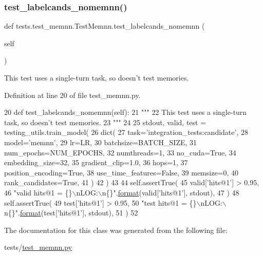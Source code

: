\subsubsection{\texorpdfstring{test\+\_\+labelcands\+\_\+nomemnn()}{test\_labelcands\_nomemnn()}}
{\footnotesize\ttfamily def tests.\+test\+\_\+memnn.\+Test\+Memnn.\+test\+\_\+labelcands\+\_\+nomemnn (\begin{DoxyParamCaption}\item[{}]{self }\end{DoxyParamCaption})}

\begin{DoxyVerb}This test uses a single-turn task, so doesn't test memories.
\end{DoxyVerb}
 

Definition at line 20 of file test\+\_\+memnn.\+py.


\begin{DoxyCode}
20     \textcolor{keyword}{def }test\_labelcands\_nomemnn(self):
21         \textcolor{stringliteral}{"""}
22 \textcolor{stringliteral}{        This test uses a single-turn task, so doesn't test memories.}
23 \textcolor{stringliteral}{        """}
24 
25         stdout, valid, test = testing\_utils.train\_model(
26             dict(
27                 task=\textcolor{stringliteral}{'integration\_tests:candidate'},
28                 model=\textcolor{stringliteral}{'memnn'},
29                 lr=LR,
30                 batchsize=BATCH\_SIZE,
31                 num\_epochs=NUM\_EPOCHS,
32                 numthreads=1,
33                 no\_cuda=\textcolor{keyword}{True},
34                 embedding\_size=32,
35                 gradient\_clip=1.0,
36                 hops=1,
37                 position\_encoding=\textcolor{keyword}{True},
38                 use\_time\_features=\textcolor{keyword}{False},
39                 memsize=0,
40                 rank\_candidates=\textcolor{keyword}{True},
41             )
42         )
43 
44         self.assertTrue(
45             valid[\textcolor{stringliteral}{'hits@1'}] > 0.95,
46             \textcolor{stringliteral}{"valid hits@1 = \{\}\(\backslash\)nLOG:\(\backslash\)n\{\}"}.\hyperlink{namespaceparlai_1_1chat__service_1_1services_1_1messenger_1_1shared__utils_a32e2e2022b824fbaf80c747160b52a76}{format}(valid[\textcolor{stringliteral}{'hits@1'}], stdout),
47         )
48         self.assertTrue(
49             test[\textcolor{stringliteral}{'hits@1'}] > 0.95,
50             \textcolor{stringliteral}{"test hits@1 = \{\}\(\backslash\)nLOG:\(\backslash\)n\{\}"}.\hyperlink{namespaceparlai_1_1chat__service_1_1services_1_1messenger_1_1shared__utils_a32e2e2022b824fbaf80c747160b52a76}{format}(test[\textcolor{stringliteral}{'hits@1'}], stdout),
51         )
52 
\end{DoxyCode}


The documentation for this class was generated from the following file\+:\begin{DoxyCompactItemize}
\item 
tests/\hyperlink{test__memnn_8py}{test\+\_\+memnn.\+py}\end{DoxyCompactItemize}
